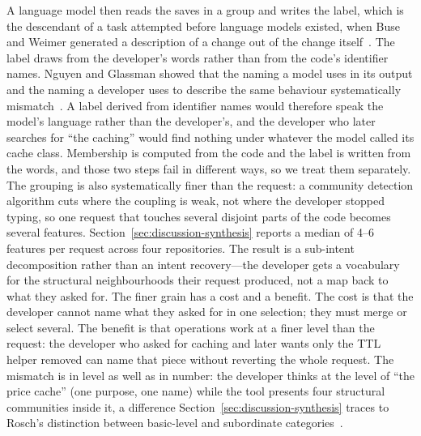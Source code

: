A language model then reads the saves in a group
and writes the label, which is the descendant of a task attempted before language
models existed, when Buse and Weimer generated a description of a change out of the
change itself~\cite{buse2010}. The label draws from the developer's words rather than
from the code's identifier names. Nguyen and
Glassman showed that the naming a model uses in its output and the naming a
developer uses to describe the same behaviour systematically
mismatch~\cite{nguyen2024}. A label derived from identifier names would therefore speak the
model's language rather than the developer's, and the developer who later searches
for ``the caching'' would find nothing under whatever the model called its cache
class. Membership is computed from the code and the label is written from the words,
and those two steps fail in different ways, so we treat them separately. The
grouping is also systematically finer than the request: a community detection
algorithm cuts where the coupling is weak, not where the developer stopped
typing, so one request that touches several disjoint parts of the code becomes
several features. Section~\ref{sec:discussion-synthesis} reports a median of
4--6 features per request across four repositories. The result is a sub-intent
decomposition rather than an intent recovery---the developer gets a vocabulary
for the structural neighbourhoods their request produced, not a map back to what
they asked for. The finer grain has a cost and a benefit. The cost is that the
developer cannot name what they asked for in one selection; they must merge or
select several. The benefit is that operations work at a finer level than the
request: the developer who asked for caching and later wants only the TTL
helper removed can name that piece without reverting the whole request. The
mismatch is in level as well as in number: the
developer thinks at the level of ``the price cache'' (one purpose, one name) while
the tool presents four structural communities inside it, a difference
Section~\ref{sec:discussion-synthesis} traces to Rosch's distinction between
basic-level and subordinate categories~\cite{rosch1978}.

